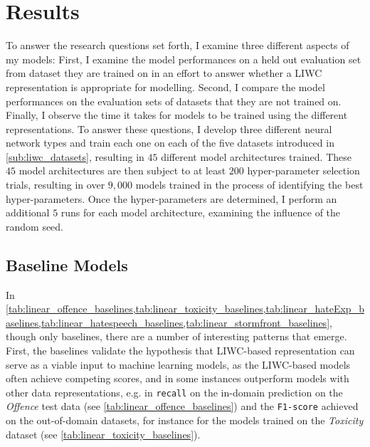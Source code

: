 \section{Results}

To answer the research questions set forth, I examine three different aspects of my models: First, I examine the model performances on a held out evaluation set from dataset they are trained on in an effort to answer whether a LIWC representation is appropriate for modelling.
Second, I compare the model performances on the evaluation sets of datasets that they are not trained on. Finally, I observe the time it takes for models to be trained using the different representations.
To answer these questions, I develop three different neural network types and train each one on each of the five datasets introduced in \cref{sub:liwc_datasets}, resulting in $45$ different model architectures trained. These $45$ model architectures are then subject to at least $200$ hyper-parameter selection trials, resulting in over $9,000$ models trained in the process of identifying the best hyper-parameters. Once the hyper-parameters are determined, I perform an additional $5$ runs for each model architecture, examining the influence of the random seed.

\subsection{Baseline Models}
In \cref{tab:linear_offence_baselines,tab:linear_toxicity_baselines,tab:linear_hateExp_baselines,tab:linear_hatespeech_baselines,tab:linear_stormfront_baselines}, though only baselines, there are a number of interesting patterns that emerge.
First, the baselines validate the hypothesis that LIWC-based representation can serve as a viable input to machine learning models, as the LIWC-based models often achieve competing scores, and in some instances outperform models with other data representations, e.g. in \texttt{recall} on the in-domain prediction on the \textit{Offence} test data (see \cref{tab:linear_offence_baselines}) and the \texttt{F1-score} achieved on the out-of-domain datasets, for instance for the models trained on the \textit{Toxicity} dataset (see \cref{tab:linear_toxicity_baselines}).


